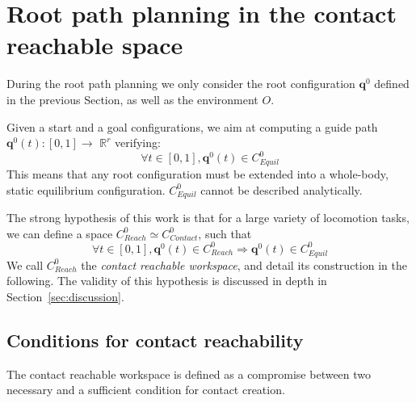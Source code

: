\section{Root path planning in the contact reachable space}
\label{rbprm}

During the root path planning we only consider the root configuration $\mathbf{q}^0$ defined in the previous Section,
as well as the environment $O$.

Given a start and a goal configurations, we aim at computing a guide path $\mathbf{q}^0(t) : [0,1] \longrightarrow$ $\mathbb{R}^r$ verifying:
\begin{equation*} \label{eq:path}
\forall t \in [0,1], \mathbf{q}^0(t)  \in C_{Equil}^0
\end{equation*}
This means that any root configuration must be extended into a whole-body, static equilibrium configuration.
$C_{Equil}^0$  cannot be described analytically.

The strong hypothesis of this work is that for a large variety of locomotion tasks, we can define a space  $C_{Reach}^0 \simeq C_{Contact}^0$, such that 
\begin{equation} \label{eq:creach}
\forall t \in [0,1], \mathbf{q}^0(t) \in C_{Reach}^0 \Rightarrow \mathbf{q}^0(t)  \in C_{Equil}^0
\end{equation}
We call  $C_{Reach}^0$ the \textit{contact reachable workspace}, and detail its construction in the following.
The validity of this hypothesis is discussed in depth in Section~\ref{sec:discussion}.
 
\subsection{Conditions for contact reachability}
The contact reachable workspace is defined as a compromise between two necessary and a sufficient condition for contact creation.

